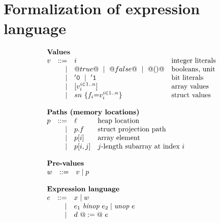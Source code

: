 \documentclass[nocopyrightspace,preprint,onecolumn,10pt]{sigplanconf}  %
\theoremstyle{remark}
\theoremstyle{definition}
\theoremstyle{plain}
\begin{document}
\section{Formalization of expression language}
\newcommand{\bzero}{{\tt '0}}
\newcommand{\bone}{{\tt '1}}
\newcommand{\proj}[2]{#1{.}#2}

\begin{figure}
\[\begin{array}{l}
  \begin{array}{rrll}
   \multicolumn{4}{l}{\text{\bf Values}} \\ 
      v & ::=  & i                              & \text{integer literals} \\
        & \mid & @true@~\mid~@false@~\mid~@()@  & \text{booleans, unit}   \\ 
        & \mid & \bzero~\mid~\bone              & \text{bit literals}     \\
        & \mid & [v_i^{i \in 1..n}]                & \text{array values}      \\
        & \mid & sn~\{ f_i{=}v_i^{i \in 1..n}\}    & \text{struct values}
  \end{array} \\ \\ 
  \begin{array}{rrll}
   \multicolumn{4}{l}{\text{\bf Paths (memory locations)}} \\ 
     p &  ::= & \ell   & \text{heap location} \\ 
       & \mid & \proj{p}{f} & \text{struct projection path} \\ 
       & \mid & p[i]   & \text{array element} \\ 
       & \mid & p[i,j] & \text{$j$-length subarray at index $i$}
  \end{array} \\ \\ 
  \begin{array}{rrll}
   \multicolumn{4}{l}{\text{\bf Pre-values}} \\ 
     w &  ::= & v \mid p 
  \end{array} \\ \\ 
  \begin{array}{rrll} 
   \multicolumn{4}{l}{\text{\bf Expression language}} \\ 
     e & ::=  & x \mid w \\
       & \mid & e_1~\textit{binop}~e_2 \mid \textit{unop}~e \\
       & \mid & d~@:=@~e \\ 

\end{array}
\end{array}\]
\end{figure}
\end{document}
